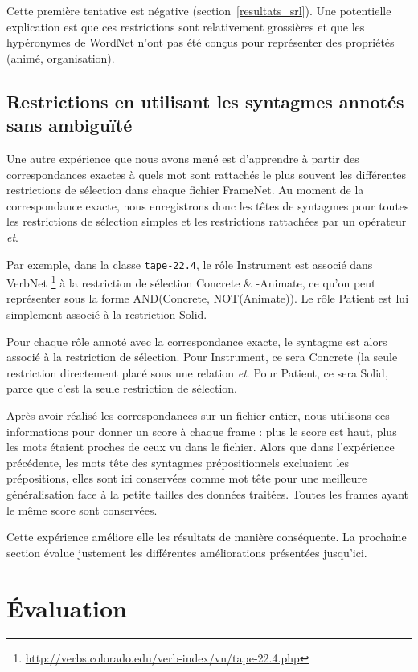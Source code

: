 Cette première tentative est négative (section~\ref{resultats_srl}). Une
potentielle explication est que ces restrictions sont relativement grossières
et que les hypéronymes de WordNet n'ont pas été conçus pour représenter des
propriétés (animé, organisation).

\subsection{Restrictions en utilisant les syntagmes annotés sans ambiguïté}
\label{restrictions_verbnet}

Une autre expérience que nous avons mené est d'apprendre à partir des
correspondances exactes à quels mot sont rattachés le plus souvent les
différentes restrictions de sélection dans chaque fichier FrameNet. Au moment
de la correspondance exacte, nous enregistrons donc les têtes de syntagmes pour
toutes les restrictions de sélection simples et les restrictions rattachées par
un opérateur \textit{et}.

Par exemple, dans la classe \texttt{tape-22.4}, le rôle Instrument est associé
dans VerbNet
\footnote{\url{http://verbs.colorado.edu/verb-index/vn/tape-22.4.php}} à la
restriction de sélection Concrete \& -Animate, ce qu'on peut représenter sous
la forme AND(Concrete, NOT(Animate)). Le rôle Patient est lui simplement
associé à la restriction Solid.

Pour chaque rôle annoté avec la correspondance exacte, le syntagme est alors
associé à la restriction de sélection. Pour Instrument, ce sera Concrete (la
seule restriction directement placé sous une relation \textit{et}. Pour Patient,
ce sera Solid, parce que c'est la seule restriction de sélection.

Après avoir réalisé les correspondances sur un fichier entier, nous utilisons
ces informations pour donner un score à chaque frame : plus le score est haut,
plus les mots étaient proches de ceux vu dans le fichier. Alors que dans
l'expérience précédente, les mots tête des syntagmes prépositionnels excluaient
les prépositions, elles sont ici conservées comme mot tête pour une meilleure
généralisation face à la petite tailles des données traitées. Toutes les frames
ayant le même score sont conservées.

Cette expérience améliore elle les résultats de manière conséquente. La
prochaine section évalue justement les différentes améliorations présentées
jusqu'ici.

\section{Évaluation}
\label{srl:evaluation}


